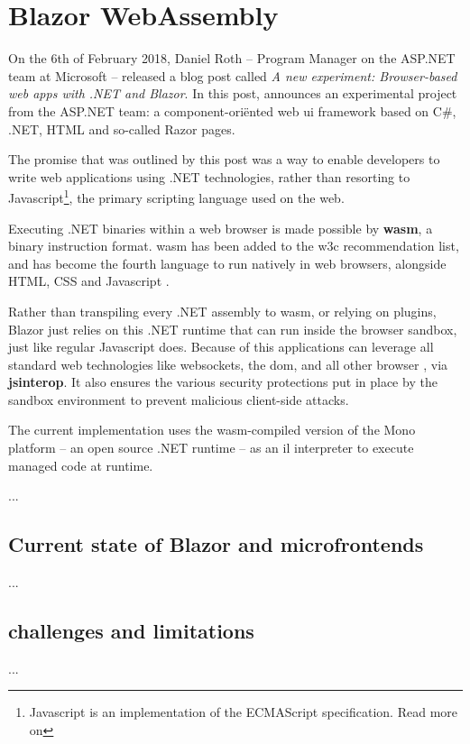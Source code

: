 \section{Blazor WebAssembly}

On the 6th of February 2018, Daniel Roth -- Program Manager on the ASP.NET team
at Microsoft -- released a blog post called \textit{A new experiment:
Browser-based web apps with .NET and Blazor}. In this post, \textcite{Roth_2018}
announces an experimental project from the ASP.NET team: a component-ori\"ented
web \gls{ui} framework based on C\#, .NET, HTML and so-called Razor pages. 

The promise that was outlined by this post was a way to enable developers to
write web applications using .NET technologies, rather than resorting to
Javascript\footnote{Javascript is an implementation of the ECMAScript
specification. Read more on }, the
primary scripting language used on the web.

Executing .NET binaries within a web browser is made possible by
\textbf{\gls{wasm}}, a binary instruction format.
\Gls{wasm} has been added to the \gls{w3c} recommendation list, and has become
the fourth language to run natively in web browsers, alongside HTML, CSS and
Javascript \autocite{Couriol_2019}. 

Rather than \gls{transpiling} every .NET assembly to \gls{wasm}, or relying on
plugins, Blazor just relies on this .NET runtime that can run inside the browser
sandbox, just like regular Javascript does. Because of this applications can
leverage all standard web technologies like websockets, the \gls{dom}, and all
other browser , via \textbf{\gls{jsinterop}}. It also ensures the
various security protections put in place by the sandbox environment to prevent
malicious client-side attacks.

The current implementation uses the \gls{wasm}-compiled version of the
Mono platform -- an open source .NET
runtime -- as an \gls{il} interpreter to execute managed code at runtime.



...


\subsection{Current state of Blazor and microfrontends}
...

\subsection{challenges and limitations}
...